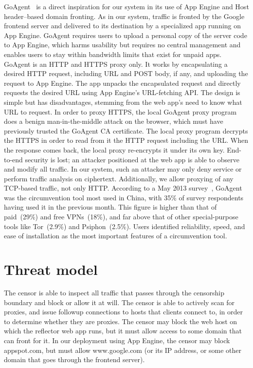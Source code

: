 \documentclass{article}
\begin{document}
GoAgent~\cite{goagent} is a direct inspiration for our system in its use of App
Engine and Host header--based domain fronting.
As in our system, traffic is fronted by the Google frontend server
and delivered to its destination by a specialized app running on App Engine.
GoAgent requires users to upload a personal copy of the server code to App Engine,
which harms usability but requires no central management
and enables users to stay within bandwidth limits that exist for unpaid apps.
GoAgent is an HTTP and HTTPS proxy only.
It works by encapsulating a desired HTTP request, including URL and POST body, if any,
and uploading the request to App Engine.
The app unpacks the encapsulated request and directly requests the desired URL using
App Engine's URL-fetching API.
The design is simple but has disadvantages, stemming from the web app's
need to know what URL to request.
In order to proxy HTTPS, the local GoAgent proxy program does a benign man-in-the-middle
attack on the browser, which must have previously trusted the GoAgent CA certificate.
The local proxy program decrypts the HTTPS in order to read from it the HTTP request including the URL.
When the response comes back, the local proxy re-encrypts it under its own key.
End-to-end security is lost; an attacker positioned at the web app
is able to observe and modify all traffic.
In our system, such an attacker may only deny service or perform traffic analysis on ciphertext.
Additionally, we allow proxying of any TCP-based traffic, not only HTTP.
According to a May 2013 survey~\cite{collateral-freedom},
GoAgent was the circumvention tool most used in
China, with 35\% of survey respondents having used it in the previous month.
This figure is higher than that of paid~(29\%) and free VPNs~(18\%), and far
above that of other special-purpose tools like Tor~(2.9\%) and Psiphon~(2.5\%).
Users identified reliability, speed, and ease of installation as the most important features of a circumvention tool.


\section{Threat model}

The censor is able to inspect all traffic that passes through
the censorship boundary and block or allow it at will.
The censor is able to actively scan for proxies, and issue followup
connections to hosts that clients connect to, in order to determine
whether they are proxies.
The censor may block the web host on which the reflector web app runs,
but it must allow access to some domain that can front for it.
In our deployment using App Engine, the censor may block appspot.com,
but must allow www.google.com (or its IP address, or some other domain
that goes through the frontend server).
\end{document}

